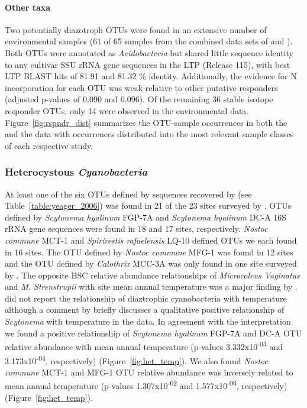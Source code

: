 \paragraph{Other taxa} 
Two potentially diazotroph OTUs were found in an extensive number of
environmental samples (61 of 65 samples from the combined data sets of
\citet{Garcia_Pichel_2013} and \citet{Steven_2013}). Both OTUs were annotated
as \textit{Acidobacteria} but shared little sequence identity to any cultivar
SSU rRNA gene sequences in the LTP (Release 115), with best LTP BLAST hits of
81.91 and 81.32 \% identity. Additionally, the evidence for N incorporation for
each OTU was weak relative to other putative responders (adjusted p-values of
0.090 and 0.096). Of the remaining 36 stable isotope responder OTUs, only 14
were observed in the environmental data. Figure~\ref{fig:rspndr_dist}
summarizes the OTU-sample occurrences in both the \citet{Steven_2013} and the
\citet{Garcia_Pichel_2013} data with occurrences distributed into the most
relevant sample classes of each respective study.

\subsubsection{Heterocystous \textit{Cyanobacteria}} At least one of the six
OTUs defined by sequences recovered by \citet{Yeager} (see
Table~\ref{table:yeager_2006}) was found in 21 of the 23 sites surveyed by
\citet{Garcia_Pichel_2013}. OTUs defined by \textit{Scytonema hyalinum} FGP-7A
and \textit{Scytonema hyalinum} DC-A 16S rRNA gene sequences were found in 18
and 17 sites, respectively. \textit{Nostoc commune} MCT-1 and
\textit{Spirirestis rafaelensis} LQ-10 defined OTUs we each found in 16 sites.
The OTU defined by \textit{Nostoc commune} MFG-1 was found in 12 sites and the
OTU defined by \textit{Calothrix} MCC-3A was only found in one site surveyed by
\citet{Garcia_Pichel_2013}. The opposite BSC relative abundance relationships
of \textit{Microcoleus Vaginatus} and \textit{M. Strenstrupii} with site mean
annual temperature was a major finding by \citet{Garcia_Pichel_2013}.
\citet{Garcia_Pichel_2013} did not report the relationship of diaztrophic
cyanobacteria with temperature although a comment by \citet{Belnap28062013}
briefly discusses a qualitative positive relationship of \textit{Scytonema}
with temperature in the \citet{Garcia_Pichel_2013} data. In agreement with the
\citet{Belnap28062013} interpretation we found a positive relationship of
\textit{Scytonema hyalinum} FGP-7A and DC-A OTU relative abundance with mean
annual temperature (p-values 3.332x10\textsuperscript{-03} and
3.173x10\textsuperscript{-04}, respectively) (Figure~\ref{fig:het_temp}). We
also found \textit{Nostoc commune} MCT-1 and MFG-1 OTU relative abundance was
inversely related to mean annual temperature (p-values
1.307x10\textsuperscript{-02} and 1.577x10\textsuperscript{-06}, respectively)
(Figure~\ref{fig:het_temp}). 

